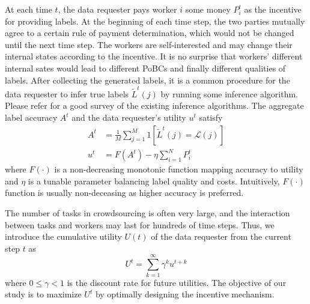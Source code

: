 At each time $t$, the data requester pays worker $i$ some money $P^{t}_{i}$ as the incentive for providing labels.
At the beginning of each time step, the two parties mutually agree to a certain rule of payment determination, which would not be changed until the next time step.
The workers are self-interested and may change their internal states according to the incentive. It is no surprise that workers' different internal sates would lead to different PoBCs and finally different qualities of labels. After collecting the generated labels, it is a common procedure for the data requester to infer true labels $\tilde{L}^t(j)$ by running some inference algorithm. Please refer \citet{zheng2017truth} for a good survey of the existing inference algorithms.
The aggregate label accuracy $A^t$ and the data requester's utility $u^t$ satisfy
\begin{equation}
\label{equation:utility}
\begin{split}
A^t&=\frac{1}{M}{\sum}_{j=1}^{M}1\left[\tilde{L}^{t}(j)=\mathcal{L}(j)\right]\\
u^t &= F(A^t) - \eta {\sum}_{i=1}^{N}P^t_i
\end{split}
\end{equation}
where $F(\cdot)$ is a non-decreasing monotonic function mapping accuracy to utility and $\eta$ is a
tunable parameter balancing label quality and costs. Intuitively, $F(\cdot)$ function is usually non-deceasing as higher accuracy is preferred.

The number of tasks in crowdsourcing is often very large, and the interaction between tasks and workers may last for hundreds of time steps.
Thus, we introduce the cumulative utility $U(t)$ of the data requester from the current step $t$ as
\begin{equation}
U^t={\sum}_{k=1}^{\infty}\gamma^{k}u^{t+k}
\end{equation}
where $0\leq \gamma< 1$ is the discount rate for future utilities.
The objective of our study is to maximize $U^t$ by optimally designing %
the incentive mechanism.